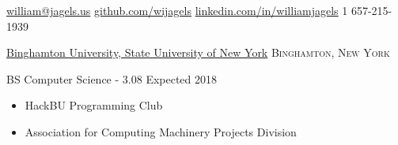 \documentclass[11pt]{article}
\begin{document}
\sloppy  %



\nobreakvspace{0.3em}  %

\noindent\href{mailto:william@jagels.us}{william@jagels.us}\sbull
\href{https://github.com/wijagels}{github.com/wijagels}\sbull
\href{https://www.linkedin.com/in/williamjagels}{linkedin.com/in/williamjagels}\sbull
\textsmaller{+}1 657-215-1939



\spacedhrule{0.1em}{0.9em}  %

\headedsection
{\href{http://www.binghamton.edu/index.php}{Binghamton University, State University of New York}}
{\textsc{Binghamton, New York}} {
	\headedsubsection
	{BS Computer Science -  3.08}
	{Expected 2018}
	{\bodytext
		{
			\begin{itemize}
				\item HackBU Programming Club
				\item Association for Computing Machinery Projects Division
			\end{itemize}
		}
	}
}



\spacedhrule{0.1em}{0.9em}  %
\end{document}
